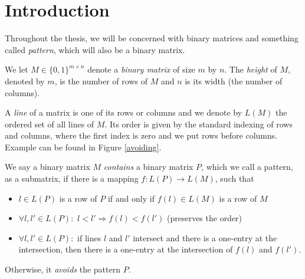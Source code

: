 \chapter*{Introduction}
Throughout the thesis, we will be concerned with binary matrices and something called \emph{pattern}, which will also be a binary matrix.
\begin{defn}
We let $M\in\{0,1\}^{m\times n}$ denote a \emph{binary matrix} of size $m$ by $n$. The \emph{height} of $M$, denoted by $m$, is the number of rows of $M$ and $n$ is its width (the number of columns).
\end{defn}
\begin{defn}
A \emph{line} of a matrix is one of its rows or columns and we denote by $L(M)$ the ordered set of all lines of $M$. Its order is given by the standard indexing of rows and columns, where the first index is zero and we put rows before columns. Example can be found in Figure \ref{avoiding}.
\end{defn}
\begin{defn}
We say a binary matrix $M$ \emph{contains} a binary matrix $P$, which we call a pattern, as a submatrix, if there is a mapping $f:L(P)\rightarrow L(M)$, such that
\begin{itemize}
\item $l\in L(P)$ is a row of $P$ if and only if $f(l)\in L(M)$ is a row of $M$
\item $\forall l,l'\in L(P):$ $l<l'\Rightarrow f(l)<f(l')$ (preserves the order)
\item $\forall l,l'\in L(P):$ if lines $l$ and $l'$ intersect and there is a one-entry at the intersection, then there is a one-entry at the intersection of $f(l)$ and $f(l')$.
\end{itemize}
Otherwise, it \emph{avoids} the pattern $P$.
\end{defn}
